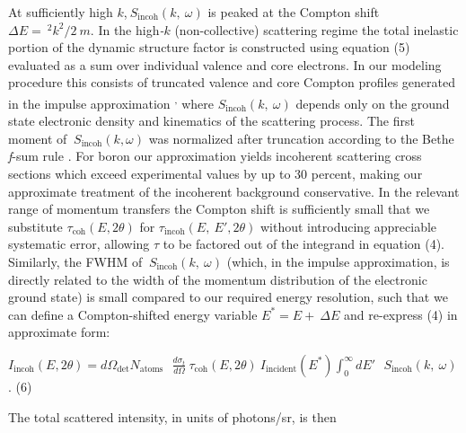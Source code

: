At sufficiently high
\(k\),\(\ S_{\text{incoh}}\left( k,\ \omega \right)\) is peaked at the
Compton shift \(\Delta E = \ ^{2}k^{2}/2\ m\). In the high\emph{-}\(k\)
(non-collective) scattering regime the total inelastic portion of the
dynamic structure factor is constructed using equation (5) evaluated as
a sum over individual valence and core electrons. In our modeling
procedure this consists of truncated valence and core Compton profiles
generated in the impulse approximation
\hyperref[w.-schuelke-electron-dynamics-by-inelastic-x-ray-scattering-oxford-university-press-new-york-2007.]\cite{SCHULKE2007ELECTRON}\textsuperscript{,}
\hyperref[p.-eisenberger-and-p.-m.-platzman-physical-review-a-2-415-1970.]\cite{EISENBERGER1970COMPTON}
where \(S_{\text{incoh}}\left( k,\ \omega \right)\) depends only on the
ground state electronic density and kinematics of the scattering
process. The first moment of
\(\ S_{\text{incoh}}\left( k,\omega \right)\) was normalized after
truncation according to the Bethe \emph{f}-sum rule
\hyperref[b.-a.-mattern-g.-t.-seidler-j.-j.-kas-j.-i.-pacold-and-j.-j.-rehr-physical-review-b-85-115135-2012.]\cite{MATTERN2012REAL}.
For boron our approximation yields incoherent scattering cross sections
which exceed experimental values by up to 30 percent, making our
approximate treatment of the incoherent background conservative. In the
relevant range of momentum transfers the Compton shift is sufficiently
small that we substitute \(\tau_{\text{coh}}\left( E,2\theta \right)\)
for \(\tau_{\text{incoh}}\left( E,\ E',2\theta \right)\) without
introducing appreciable systematic error, allowing \(\tau\) to be
factored out of the integrand in equation (4). Similarly, the FWHM of
\(\ S_{\text{incoh}}\left( k,\ \omega \right)\) (which, in the impulse
approximation, is directly related to the width of the momentum
distribution of the electronic ground state) is small compared to our
required energy resolution, such that we can define a Compton-shifted
energy variable \(E^{*} = E + \ \Delta E\) and re-express (4) in
approximate form:

\(I_{\text{incoh}}\left( E,2\theta \right) = d\Omega_{\det}N_{\text{atoms}}\text{\ \ }\frac{d\sigma_{t}}{d\Omega}\ \tau_{\text{coh}}\left( E,2\theta \right)\ I_{\text{incident}}\left( E^{*} \right)\int_{0}^{\infty}{dE'}\text{\ \ }S_{\text{incoh}}\left( k,\ \omega \right)\).
(6)

The total scattered intensity, in units of photons/sr, is then

